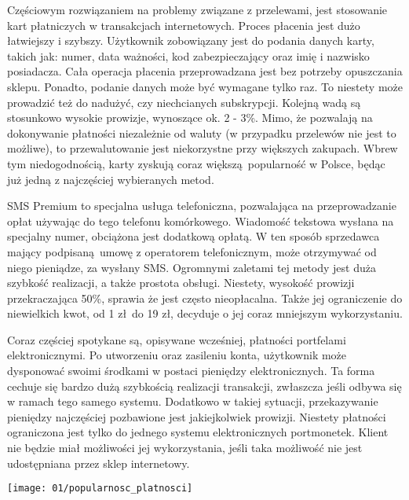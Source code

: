 Częściowym rozwiązaniem na problemy związane z przelewami, jest stosowanie kart płatniczych w transakcjach internetowych. Proces płacenia jest dużo łatwiejszy i szybszy. Użytkownik zobowiązany jest do podania danych karty, takich jak: numer, data ważności, kod zabezpieczający oraz imię i nazwisko posiadacza. Cała operacja płacenia przeprowadzana jest bez potrzeby opuszczania sklepu. Ponadto, podanie danych może być wymagane tylko raz. To niestety może prowadzić też do nadużyć, czy niechcianych subskrypcji. Kolejną wadą są stosunkowo wysokie prowizje, wynoszące ok. 2 - 3\%. Mimo, że pozwalają na dokonywanie płatności niezależnie od waluty (w przypadku przelewów nie jest to możliwe), to przewalutowanie jest niekorzystne przy większych zakupach. Wbrew tym niedogodnością, karty zyskują coraz większą popularność w Polsce, będąc już jedną z najczęściej wybieranych metod.

SMS Premium to specjalna usługa telefoniczna, pozwalająca na przeprowadzanie opłat używając do tego telefonu komórkowego. Wiadomość tekstowa wysłana na specjalny numer, obciążona jest dodatkową opłatą. W ten sposób sprzedawca mający podpisaną umowę z operatorem telefonicznym, może otrzymywać od niego pieniądze, za wysłany SMS. Ogromnymi zaletami tej metody jest duża szybkość realizacji, a także prostota obsługi. Niestety, wysokość prowizji przekraczająca 50\%, sprawia że jest często nieopłacalna. Także jej ograniczenie do niewielkich kwot, od 1 zł do 19 zł, decyduje o jej coraz mniejszym wykorzystaniu.

Coraz częściej spotykane są, opisywane wcześniej, płatności portfelami elektronicznymi. Po utworzeniu oraz zasileniu konta, użytkownik może dysponować swoimi środkami w postaci pieniędzy elektronicznych. Ta forma cechuje się bardzo dużą szybkością realizacji transakcji, zwłaszcza jeśli odbywa się w ramach tego samego systemu. Dodatkowo w takiej sytuacji, przekazywanie pieniędzy najczęściej pozbawione jest jakiejkolwiek prowizji. Niestety płatności ograniczona jest tylko do jednego systemu elektronicznych portmonetek. Klient nie będzie miał możliwości jej wykorzystania, jeśli taka możliwość nie jest udostępniana przez sklep internetowy.
\begin{center}
	\texttt{[image: 01/popularnosc\_platnosci]}
\end{center}


